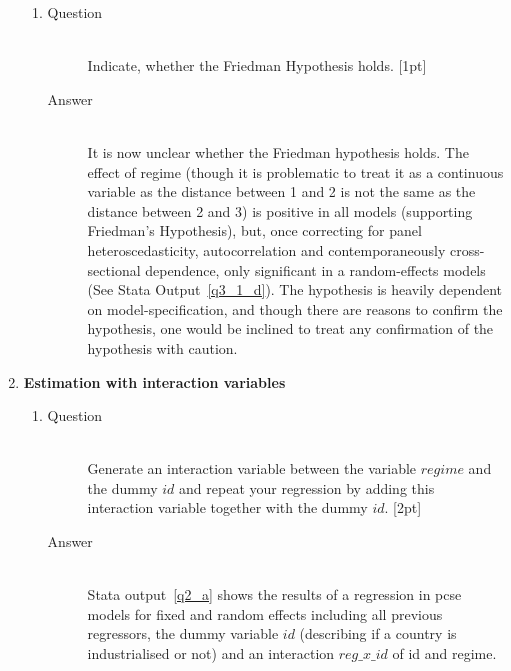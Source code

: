 \documentclass{article}
\begin{document}
\begin{enumerate}
\begin{enumerate}[label=(\alph*)]
    
    \item 
    \begin{description}
      \item[Question] \hfill \\
      Indicate, whether the Friedman Hypothesis holds. [1pt]
      \item[Answer] \hfill \\
      It is now unclear whether the Friedman hypothesis holds. The effect of regime (though it is problematic to treat it as a continuous variable as the distance between 1 and 2 is not the same as the distance between 2 and 3) is positive in all models (supporting Friedman's Hypothesis), but, once correcting for panel heteroscedasticity, autocorrelation and contemporaneously cross-sectional dependence, only significant in a random-effects models (See Stata Output~\ref{q3_1_d}). The hypothesis is heavily dependent on model-specification, and though there are reasons to confirm the hypothesis, one would be inclined to treat any confirmation of the hypothesis with caution.
    \end{description}
  \end{enumerate}
  \item \textbf{Estimation with interaction variables}
  \begin{enumerate}[label=(\alph*)]
    \item 
    \begin{description}
      \item[Question] \hfill \\
      Generate an interaction variable between the variable \(regime\) and the dummy \(id\) and repeat your regression by adding this interaction variable together with the dummy \(id\). [2pt]
      \item[Answer] \hfill \\
      Stata output~\ref{q2_a} shows the results of a regression in pcse models for fixed and random effects including all previous regressors,  the dummy variable \(id\) (describing if a country is industrialised or not) and an interaction \(reg\_x\_id\) of id and regime.
      \begin{figure}
      
      \end{figure}
    \end{description}
    

\end{enumerate}
\end{enumerate}
\end{document}
